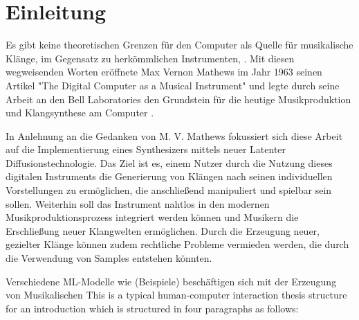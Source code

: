 \documentclass[
  a4paper,  %
  twoside,  %
  bibliography=totoc,
  headsepline,
  cleardoublepage=empty,
  parskip=half,
  draft=false
]{scrbook}
\begin{document}
%
%


\chapter{Einleitung}
\label{sec:introduction}

\glqq Es gibt keine theoretischen Grenzen für den Computer als Quelle für musikalische Klänge, im Gegensatz zu herkömmlichen Instrumenten\grqq, \cite{mathews_digital_1963}. Mit diesen wegweisenden Worten eröffnete Max Vernon Mathews im Jahr 1963 seinen Artikel "The Digital Computer as a Musical Instrument" und legte durch seine Arbeit an den Bell Laboratories den Grundstein für die heutige Musikproduktion und Klangsynthese am Computer \cite{mathews_music_2004}.

In Anlehnung an die Gedanken von M. V. Mathews fokussiert sich diese Arbeit auf die Implementierung eines Synthesizers mittels neuer Latenter Diffusionstechnologie. Das Ziel ist es, einem Nutzer durch die Nutzung dieses digitalen Instruments die Generierung von Klängen nach seinen individuellen Vorstellungen zu ermöglichen, die anschließend manipuliert und spielbar sein sollen. Weiterhin soll das Instrument nahtlos in den modernen Musikproduktionsprozess integriert werden können und Musikern die Erschließung neuer Klangwelten ermöglichen. Durch die Erzeugung neuer, gezielter Klänge können zudem rechtliche Probleme vermieden werden, die durch die Verwendung von Samples entstehen könnten.

Verschiedene ML-Modelle wie (Beispiele) beschäftigen sich mit der Erzeugung von Musikalischen 
This is a typical human-computer interaction thesis structure for an introduction which is structured in four paragraphs as follows:



\end{document}

